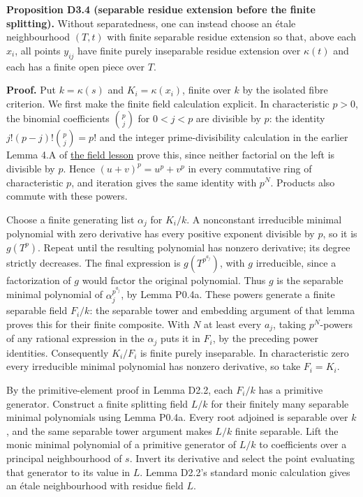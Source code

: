 \documentclass[11pt,a4paper,openany]{report}
\begin{document}
\textbf{Proposition D3.4 (separable residue extension before the finite splitting).} Without separatedness, one can instead choose an étale neighbourhood \((T,t)\) with finite separable residue extension so that, above each \(x_i\), all points \(y_{ij}\) have finite purely inseparable residue extension over \(\kappa(t)\) and each has a finite open piece over \(T\).

\textbf{Proof.} Put \(k=\kappa(s)\) and \(K_i=\kappa(x_i)\), finite over \(k\) by the isolated fibre criterion. We first make the finite field calculation explicit. In characteristic \(p>0\), the binomial coefficients \(\binom p j\) for \(0<j<p\) are divisible by \(p\): the identity \(j!(p-j)!\binom p j=p!\) and the integer prime-divisibility calculation in the earlier Lemma 4.A of \href{https://github.com/KokunoYumeto/open-math-courses/blob/main/docs/courses/AG-RG/AG-RG-S02.md}{the field lesson} prove this, since neither factorial on the left is divisible by \(p\). Hence \((u+v)^p=u^p+v^p\) in every commutative ring of characteristic \(p\), and iteration gives the same identity with \(p^N\). Products also commute with these powers.

Choose a finite generating list \(\alpha_j\) for \(K_i/k\). A nonconstant irreducible minimal polynomial with zero derivative has every positive exponent divisible by \(p\), so it is \(g(T^p)\). Repeat until the resulting polynomial has nonzero derivative; its degree strictly decreases. The final expression is \(g(T^{p^{a_j}})\), with \(g\) irreducible, since a factorization of \(g\) would factor the original polynomial. Thus \(g\) is the separable minimal polynomial of \(\alpha_j^{p^{a_j}}\), by Lemma P0.4a. These powers generate a finite separable field \(F_i/k\): the separable tower and embedding argument of that lemma proves this for their finite composite. With \(N\) at least every \(a_j\), taking \(p^N\)-powers of any rational expression in the \(\alpha_j\) puts it in \(F_i\), by the preceding power identities. Consequently \(K_i/F_i\) is finite purely inseparable. In characteristic zero every irreducible minimal polynomial has nonzero derivative, so take \(F_i=K_i\).

By the primitive-element proof in Lemma D2.2, each \(F_i/k\) has a primitive generator. Construct a finite splitting field \(L/k\) for their finitely many separable minimal polynomials using Lemma P0.4a. Every root adjoined is separable over \(k\), and the same separable tower argument makes \(L/k\) finite separable. Lift the monic minimal polynomial of a primitive generator of \(L/k\) to coefficients over a principal neighbourhood of \(s\). Invert its derivative and select the point evaluating that generator to its value in \(L\). Lemma D2.2's standard monic calculation gives an étale neighbourhood with residue field \(L\).
\end{document}
